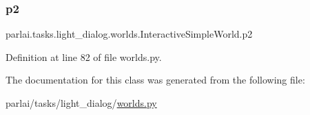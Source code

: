 \subsubsection{\texorpdfstring{p2}{p2}}
{\footnotesize\ttfamily parlai.\+tasks.\+light\+\_\+dialog.\+worlds.\+Interactive\+Simple\+World.\+p2}



Definition at line 82 of file worlds.\+py.



The documentation for this class was generated from the following file\+:\begin{DoxyCompactItemize}
\item 
parlai/tasks/light\+\_\+dialog/\hyperlink{parlai_2tasks_2light__dialog_2worlds_8py}{worlds.\+py}\end{DoxyCompactItemize}
